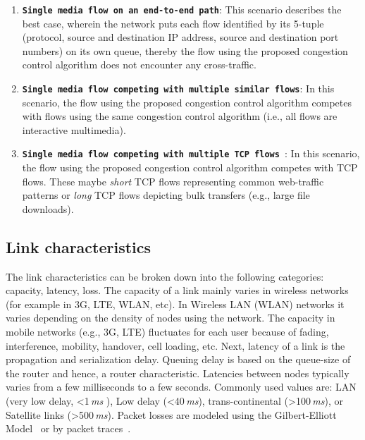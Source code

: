 \begin{enumerate}
\setlength{\itemsep}{0pt}

\item \textbf{\texttt{Single media flow on an end-to-end path}}: This scenario
describes the best case, wherein the network puts each flow identified by its
5-tuple (protocol, source and destination IP address, source and destination
port numbers) on its own queue, thereby the flow using the proposed congestion
control algorithm does not encounter any cross-traffic.

\item \textbf{\texttt{Single media flow competing with multiple similar
flows}}: In this scenario, the flow using the proposed congestion control
algorithm competes with flows using the same congestion control algorithm
(i.e., all flows are interactive multimedia).


\item \textbf{\texttt{Single media flow competing with multiple TCP flows }}:
In this scenario, the flow using the proposed congestion control algorithm
competes with TCP flows. These maybe \emph{short} TCP flows representing
common web-traffic patterns or \emph{long} TCP flows depicting bulk transfers
(e.g., large file downloads).

\end{enumerate}





\subsection{Link characteristics}

The link characteristics can be broken down into the following categories:
capacity, latency, loss. The capacity of a link mainly varies in wireless
networks (for example in 3G, LTE, WLAN, etc). In Wireless LAN (WLAN) networks
it varies depending on the density of nodes using the network. The capacity in
mobile networks (e.g., 3G, LTE) fluctuates for each user because of fading,
interference, mobility, handover, cell loading, etc. Next, latency of a link
is the propagation and serialization delay. Queuing delay is based on the
queue-size of the router and hence, a router characteristic. Latencies between
nodes typically varies from a few milliseconds to a few seconds. Commonly used
values are: LAN (very low delay, <1\,\emph{ms} ), Low delay (<40\,\emph{ms}),
trans-continental (>100\,\emph{ms}), or Satellite links (>500\,\emph{ms}).
Packet losses are modeled using the Gilbert-Elliott
Model~\cite{gilbert1960capacity, elliott1963estimates} or by packet
traces~\cite{ellis:2011:dataset, 3gppSim}.



